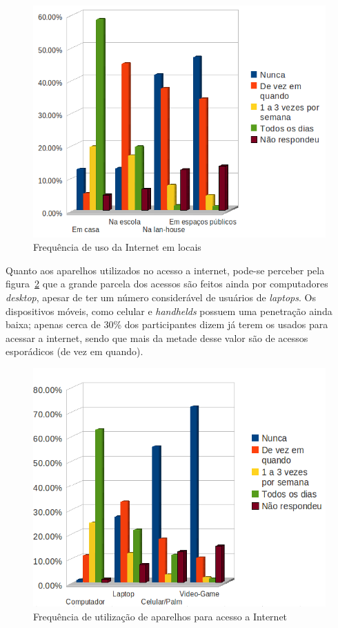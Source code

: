   \begin{figure}
      \begin{center}
	\includegraphics[width=0.7\linewidth]{arquivos/local.png}
      \end{center}
      \caption{Frequência de uso da Internet em locais}
      \label{local}
  \end{figure}

  Quanto aos aparelhos utilizados no acesso a internet, pode-se perceber pela figura~\ref{dispositivo} que a grande parcela dos acessos são feitos 
ainda por computadores \textit{desktop}, apesar de ter um número considerável de usuários de \textit{laptops}. Os dispositivos móveis, como celular 
e \textit{handhelds} possuem uma penetração ainda baixa; apenas cerca de 30\% dos participantes dizem já terem os usados para acessar 
a internet, sendo que mais da metade desse valor são de acessos esporádicos (de vez em quando).

  \begin{figure}
      \begin{center}
	\includegraphics[width=0.7\linewidth]{arquivos/dispositivo.png}
      \end{center}
      \caption{Frequência de utilização de aparelhos para acesso a Internet}
      \label{dispositivo}
  \end{figure}

